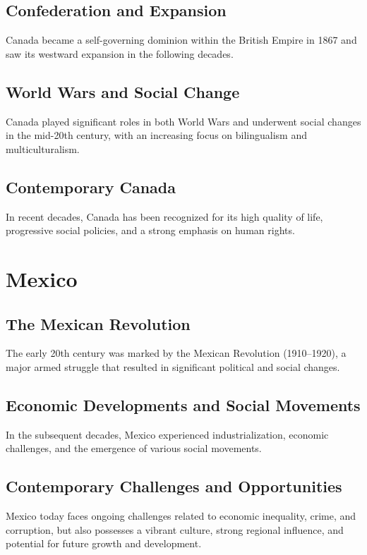 \documentclass[a4paper,12pt]{book}
\begin{document}
\subsection{Confederation and Expansion}
Canada became a self-governing dominion within the British Empire in 1867 and saw its westward expansion in the following decades.

\subsection{World Wars and Social Change}
Canada played significant roles in both World Wars and underwent social changes in the mid-20th century, with an increasing focus on bilingualism and multiculturalism.

\subsection{Contemporary Canada}
In recent decades, Canada has been recognized for its high quality of life, progressive social policies, and a strong emphasis on human rights.

\section{Mexico}
\label{sec:mexico}

\subsection{The Mexican Revolution}
The early 20th century was marked by the Mexican Revolution (1910–1920), a major armed struggle that resulted in significant political and social changes.

\subsection{Economic Developments and Social Movements}
In the subsequent decades, Mexico experienced industrialization, economic challenges, and the emergence of various social movements.

\subsection{Contemporary Challenges and Opportunities}
Mexico today faces ongoing challenges related to economic inequality, crime, and corruption, but also possesses a vibrant culture, strong regional influence, and potential for future growth and development.
\end{document}
